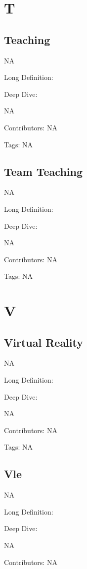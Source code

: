 \documentclass[
  letterpaper,
  DIV=11,
  numbers=noendperiod]{scrreprt}
\begin{document}
\chapter{T}\label{t}

\section{Teaching}\label{teaching}

NA

Long Definition:

Deep Dive:

NA

Contributors: NA

Tags: NA

\section{Team Teaching}\label{team-teaching}

NA

Long Definition:

Deep Dive:

NA

Contributors: NA

Tags: NA


\chapter{V}\label{v}

\section{Virtual Reality}\label{virtual-reality}

NA

Long Definition:

Deep Dive:

NA

Contributors: NA

Tags: NA

\section{Vle}\label{vle}

NA

Long Definition:

Deep Dive:

NA

Contributors: NA
\end{document}
